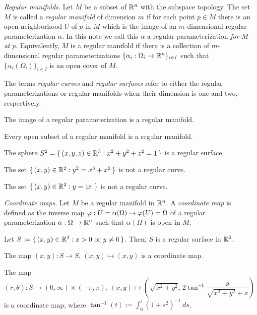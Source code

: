 \documentclass{../note}
\def\a{\alpha}
\begin{document}
\begin{prb}\emph{Regular manifolds.}
Let $M$ be a subset of $\mathbb{R}^n$ with the subspace topology.
The set $M$ is called a \emph{regular manifold} of dimension $m$ if for each point $p\in M$ there is an open neighborhood $U$ of $p$ in $M$ which is the image of an $m$-dimensional regular parameterization $\a$.
In this note we call this $\a$ a regular parameterization \emph{for $M$ at $p$}.
Equivalently, $M$ is a regular manifold if there is a collection of $m$-dimensional regular parameterizations $\{\a_i:\Omega_i\to\R^n\}_{i\in I}$ such that $\{\a_i(\Omega_i)\}_{i\in I}$ is an open cover of $M$.

The terms \emph{regular curves} and \emph{regular surfaces} refer to either the regular parameterizations or regular manifolds when their dimension is one and two, respectively. 
\begin{parts}
\item The image of a regular parameterization is a regular manifold.
\item Every open subset of a regular manifold is a regular manifold.
\item The sphere $S^2=\{\,(x,y,z)\in\mathbb{R}^3:x^2+y^2+z^2=1\,\}$ is a regular surface.
\item The set $\{\,(x,y)\in\mathbb{R}^2:y^2=x^3+x^2\,\}$ is not a regular curve.
\item The set $\{\,(x,y)\in\mathbb{R}^2:y=|x|\,\}$ is not a regular curve.
\end{parts}
\end{prb}


\begin{prb}\emph{Coordinate maps.}
Let $M$ be a regular manifold in $\mathbb{R}^n$.
A \emph{coordinate map} is defined as the inverse map $\f:U=\a(\Omega)\to\f(U)=\Omega$ of a regular parameterization $\a:\Omega\to\R^n$ such that $\a(\Omega)$ is open in $M$.

Let $S:=\{\,(x,y)\in\mathbb{R}^2:x>0\text{ or }y\ne0\,\}$.
Then, $S$ is a regular surface in $\mathbb{R}^2$.
\begin{parts}
\item The map $(x,y):S\to S,\,(x,y)\mapsto(x,y)$ is a coordinate map.
\item The map
\[(r,\theta):S\to(0,\infty)\times(-\pi,\pi),\,(x,y)\mapsto\left(\sqrt{x^2+y^2},\,2\tan^{-1}\frac y{\sqrt{x^2+y^2}+x}\right)\]
is a coordinate map, where $\tan^{-1}(t):=\int_0^t(1+s^2)^{-1}\,ds$.
\end{parts}
\end{prb}
\end{document}
